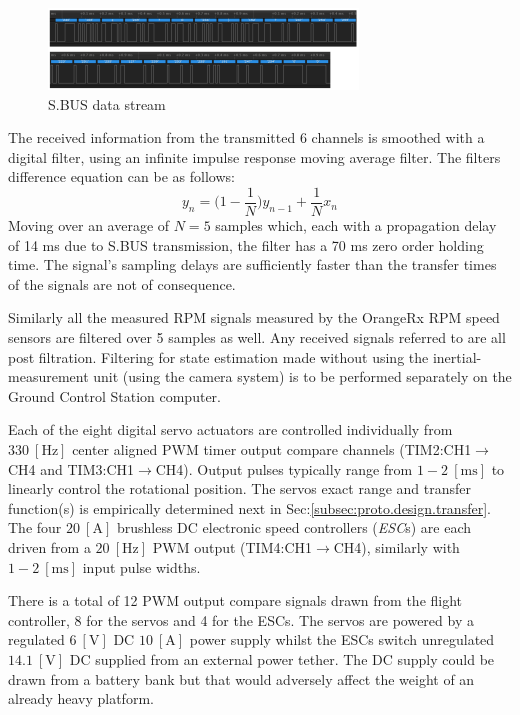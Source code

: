 \begin{figure}[hbtp]
\centering
\includegraphics[width=\textwidth]{figs/sbus}
\caption{S.BUS data stream}
\label{fig:sbus}
\vspace{-10pt}
\end{figure}
\par
{\color{red}
The received information from the transmitted 6 channels is smoothed with a digital filter, using an infinite impulse response moving average filter. The filters difference equation can be as follows: 
\begin{equation}
y_n = \big(1-\frac{1}{N}\big)y_{n-1}+\frac{1}{N}x_n
\end{equation}
Moving over an average of $N=5$ samples which, each with a propagation delay of 14 ms due to S.BUS transmission, the filter has a 70 ms zero order holding time. The signal's sampling delays are sufficiently faster than the transfer times of the signals are not of consequence. 
\par
Similarly all the measured RPM signals measured by the OrangeRx RPM speed sensors are filtered over 5 samples as well. Any received signals referred to are all post filtration. Filtering for state estimation made without using the inertial-measurement unit (using the camera system) is to be performed separately on the Ground Control Station computer.}
\par
Each of the eight digital servo actuators are controlled individually from $330~[\text{Hz}]$ center aligned PWM timer output compare channels (TIM2:CH1$\rightarrow$CH4 and TIM3:CH1$\rightarrow$CH4). Output pulses typically range from $1-2~[\text{ms}]$ to linearly control the rotational position. The servos exact range and transfer function(s) is empirically determined next in Sec:\ref{subsec:proto.design.transfer}. The four $20~[\text{A}]$ brushless DC electronic speed controllers (\emph{ESC}s) are each driven from a $20~[\text{Hz}]$ PWM output (TIM4:CH1$\rightarrow$CH4), similarly with $1-2~[\text{ms}]$ input pulse widths. 
\par
There is a total of 12 PWM output compare signals drawn from the flight controller, 8 for the servos and 4 for the ESCs. The servos are powered by a regulated $6~[\text{V}]$ DC $10~[\text{A}]$ power supply \cite{rotorstar} whilst the ESCs switch unregulated $14.1~[\text{V}]$ DC supplied from an external power tether. The DC supply could be drawn from a battery bank but that would adversely affect the weight of an already heavy platform.
